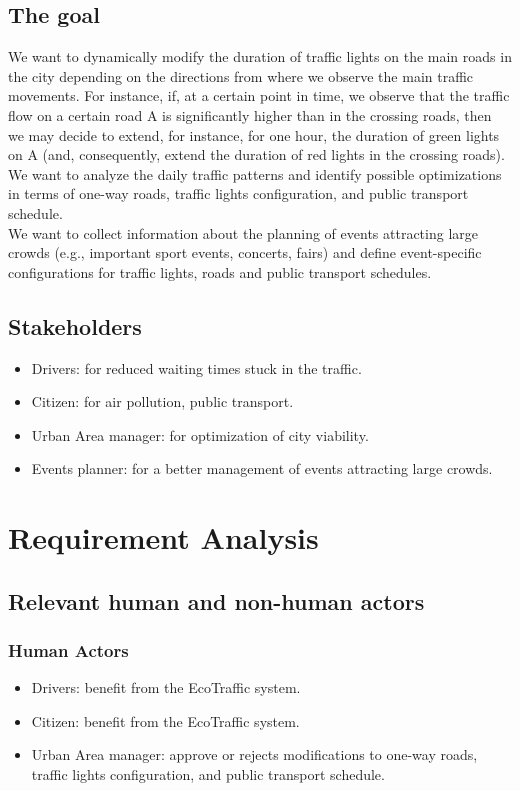 \documentclass[12pt, a4paper, twoside, openright]{report}
\begin{document}
\section{The goal}

We want to dynamically modify the duration of traffic lights on the main
roads in the city depending on the directions from where we observe the
main traffic movements. For instance, if, at a certain point in time, we
observe that the traffic flow on a certain road A is significantly
higher than in the crossing roads, then we may decide to extend, for
instance, for one hour, the duration of green lights on A (and,
consequently, extend the duration of red lights in the crossing
roads).\\
We want to analyze the daily traffic patterns and identify possible
optimizations in terms of one-way roads, traffic lights configuration,
and public transport schedule.\\
We want to collect information about the planning of events attracting
large crowds (e.g., important sport events, concerts, fairs) and define
event-specific configurations for traffic lights, roads and public
transport schedules.

\section{Stakeholders}

  \begin{itemize}
    \item Drivers: for reduced waiting times stuck in the traffic.
    \item Citizen: for air pollution, public transport.
    \item Urban Area manager: for optimization of city viability.
    \item Events planner: for a better management of events attracting large crowds.
  \end{itemize}

\chapter{Requirement Analysis}
\section{Relevant human and non-human actors}
\subsection{Human Actors}
\begin{itemize}
  \item Drivers: benefit from the EcoTraffic system.
  \item Citizen: benefit from the EcoTraffic system.
  \item Urban Area manager: approve or rejects modifications to one-way roads, traffic lights configuration, and public transport schedule.
\end{itemize}
\end{document}
